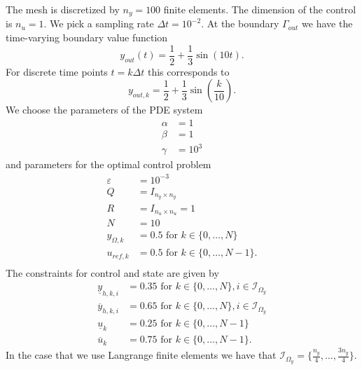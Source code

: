 \documentclass[
12pt, %
a4paper, %
onecolumn, %
portrait %
]{article}
\begin{document}
The mesh is discretized by $n_y = 100$ finite elements. The dimension of the control is $n_u = 1$. We pick a sampling rate $\Delta t = 10^{-2}$. At the boundary $\Gamma_{out}$ we have the time-varying boundary value function 
\begin{equation}
y_{out}(t) = \frac{1}{2} + \frac{1}{3} \sin(10t).
\end{equation}
For discrete time points $t = k \Delta t$ this corresponds to
\begin{equation}
y_{out,k} = \frac{1}{2} + \frac{1}{3} \sin(\frac{k}{10}).
\end{equation}
We choose the parameters of the PDE system
\begin{align*}
\alpha &= 1 \\
\beta &= 1 \\
\gamma &= 10^{3}
\end{align*}
and parameters for the optimal control problem
\begin{align*}
\varepsilon &= 10^{-3} \\
Q &= I_{n_y \times n_y} \\
R &= I_{n_u \times n_u} = 1\\
N &= 10\\
y_{\Omega,k} &= 0.5 \text{ for } k \in \{0, \hdots, N\} \\
u_{ref,k} &= 0.5 \text{ for } k \in \{0, \hdots, N-1\}. \\
\end{align*}
The constraints for control and state are given by
\begin{align*}
\underline{y}_{h,k,i} &= 0.35  \text{ for } k \in \{0, \hdots, N\}, i \in \mathcal{I}_{\Omega_y}\\
\overline{y}_{h,k,i} &= 0.65  \text{ for } k \in \{0, \hdots, N\}, i \in \mathcal{I}_{\Omega_y}\\
\underline{u}_k &= 0.25 \text{ for } k \in \{0, \hdots, N-1\}\\
\overline{u}_k &= 0.75 \text{ for } k \in \{0, \hdots, N-1\}.
\end{align*}
In the case that we use Langrange finite elements we have that $\mathcal{I}_{\Omega_y} = \{\frac{n_y}{4}, \hdots, \frac{3 n_y}{4}\}$.
\newpage

\renewcommand{\refname}{Reference} %




\end{document}
